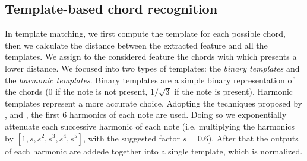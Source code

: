 \subsection{Template-based chord recognition}
\label{subsec:templates}

In template matching, we first compute the template for each possible chord, then we calculate the distance between the extracted feature and all the templates. We assign to the considered feature the chords with which presents a lower distance. We focused into two types of templates: the \textit{binary templates} and the \textit{harmonic templates}. Binary templates are a simple binary representation of the chords (0 if the note is not present, $1/\sqrt{3}$ if the note is present). Harmonic templates represent a more accurate choice. Adopting the techniques proposed by \cite{gomez2006tonal}, \cite{oudre2011chord} and \cite{Jiang2011}, the first 6 harmonics of each note are used. Doing so we exponentially attenuate each successive harmonic of each note (i.e. multiplying the harmonics by $[1, s, s^2, s^3, s^4, s^5]$, with the suggested factor $s=0.6$). After that the outputs of each harmonic are addede together into a single template, which is normalized.
